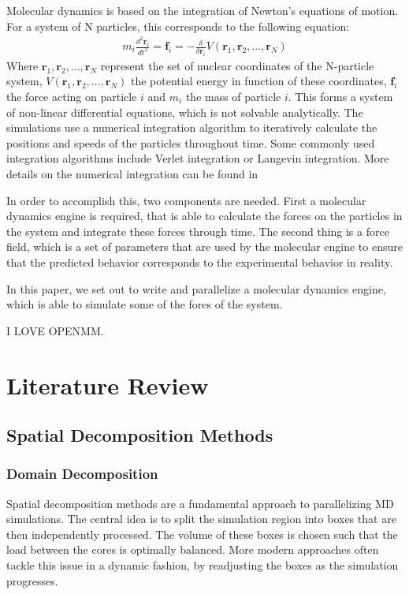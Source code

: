 \documentclass[conference]{IEEEtran}
\begin{document}
Molecular dynamics is based on the integration of Newton's equations of motion. For a system of N particles, this
 corresponds to the following equation:
\begin{align}
    m_i \frac{d^2\mathbf{r}_i}{dt^2} = \mathbf{f}_i = -\frac{\delta}{\delta \mathbf{r}_i}V(\mathbf{r}_1,\mathbf{r}_2,\ldots,\mathbf{r}_N)
\end{align}
Where $\mathbf{r}_1,\mathbf{r}_2,\ldots,\mathbf{r}_N$ represent the set of nuclear coordinates of the N-particle system, 
$V(\mathbf{r}_1,\mathbf{r}_2,\ldots,\mathbf{r}_N)$ the potential energy in function of these coordinates, $\mathbf{f}_i$
the force acting on particle $i$ and $m_i$ the mass of particle $i$. This forms a system of non-linear differential 
equations, which is not solvable analytically. The simulations use a numerical integration algorithm to iteratively
calculate the positions and speeds of the particles throughout time. Some commonly used integration algorithms
include Verlet integration or Langevin integration. More details on the numerical integration can be found in 


In order to accomplish this, two components are needed. First a
molecular dynamics engine is required, that is able to calculate the forces on the particles in the system and
integrate these forces through time. The second thing is a force field, which is a set of parameters that are
used by the molecular engine to ensure that the predicted behavior corresponds to the experimental behavior in reality.

In this paper, we set out to write and parallelize a molecular dynamics engine, which is able to simulate some of the
fores of the system.

I LOVE OPENMM.\cite{eastman2010openmm}


\section{Literature Review}

    \subsection{Spatial Decomposition Methods}

        \subsubsection{Domain Decomposition}
        Spatial decomposition methods are a fundamental approach to parallelizing MD simulations. The central idea is to 
        split the simulation region into boxes that are then independently processed. The volume of
        these boxes is chosen such that the load between the cores is optimally balanced. More modern approaches often
        tackle this issue in a dynamic fashion, by readjusting the boxes as the simulation progresses.
\end{document}
